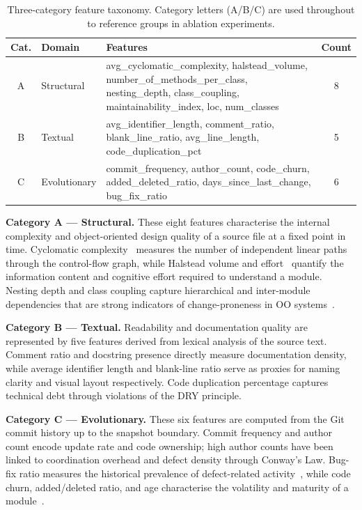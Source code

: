 \documentclass[11pt,a4paper]{article}
\begin{document}
\begin{table}[!t]
\centering
\caption{Three-category feature taxonomy. Category letters (A/B/C) are used
throughout to reference groups in ablation experiments.}
\label{tab:taxonomy}
\renewcommand{\arraystretch}{1.2}
\begin{tabular}{@{}clp{5.6cm}c@{}}
\toprule
\textbf{Cat.} & \textbf{Domain} & \textbf{Features} & \textbf{Count} \\
\midrule
\rowcolor{structcol!10}
A & Structural &
  avg\_cyclomatic\_complexity, halstead\_volume, number\_of\_methods\_per\_class,
  nesting\_depth, class\_coupling, maintainability\_index, loc, num\_classes
  & 8 \\
\rowcolor{textcol!10}
B & Textual &
  avg\_identifier\_length, comment\_ratio, blank\_line\_ratio,
  avg\_line\_length, code\_duplication\_pct
  & 5 \\
\rowcolor{evolcol!10}
C & Evolutionary &
  commit\_frequency, author\_count, code\_churn, added\_deleted\_ratio,
  days\_since\_last\_change, bug\_fix\_ratio
  & 6 \\
\bottomrule
\end{tabular}
\end{table}

\textbf{Category A --- Structural.} These eight features characterise
the internal complexity and object-oriented design quality of a source file
at a fixed point in time. Cyclomatic complexity~\cite{mccabe1976} measures
the number of independent linear paths through the control-flow graph, while
Halstead volume and effort~\cite{halstead1977} quantify the information content
and cognitive effort required to understand a module. Nesting depth and class
coupling capture hierarchical and inter-module dependencies that are strong
indicators of change-proneness in OO systems~\cite{ck1994}.

\textbf{Category B --- Textual.} Readability and documentation quality are
represented by five features derived from lexical analysis of the source text.
Comment ratio and docstring presence directly measure documentation density,
while average identifier length and blank-line ratio serve as proxies for naming
clarity and visual layout respectively. Code duplication percentage captures
technical debt through violations of the DRY principle.

\textbf{Category C --- Evolutionary.} These six features are computed from
the Git commit history up to the snapshot boundary. Commit frequency and author
count encode update rate and code ownership; high author counts have been linked
to coordination overhead and defect density through Conway's Law.
Bug-fix ratio measures the historical prevalence of defect-related
activity~\cite{hassan2009predicting}, while code churn, added/deleted ratio,
and age characterise the volatility and maturity of a module~\cite{nagappan2005use}.
\end{document}
